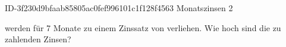 \begin{exercise}
      {ID-3f230d9bfaab85805ac0fef996101c1f128f4563}
      {Monatszinsen 2}
  \ifproblem\problem\par
     werden für \num{7} Monate zu einem Zinssatz von 
    verliehen. Wie hoch sind die zu zahlenden Zinsen?
  \fi
\end{exercise}

